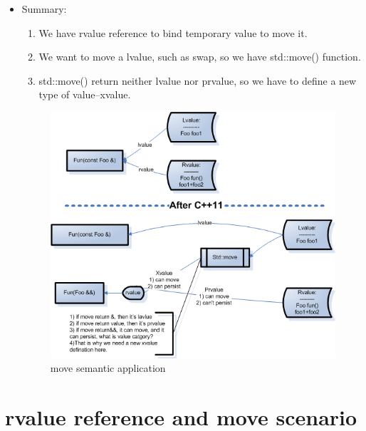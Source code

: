 \documentclass[a4paper,11pt,twoside]{book}
\begin{document}
\begin{itemize}
	\item Summary:
	\begin{enumerate}
		\item We have rvalue reference to bind temporary value to move it.
		\item We want to move a lvalue, such as swap, so we have std::move() function.
		\item std::move() return neither lvalue nor prvalue, so we have to define a new type of value--xvalue.
	\end{enumerate}

	
	\begin{figure}[h]
		\centering
		\includegraphics[width=0.7\linewidth]{pics/xvalue.png}
		\caption{move semantic application}
		\label{fig:xvalue}
	\end{figure}	
\end{itemize}

\section{rvalue reference and move scenario}
\end{document}
